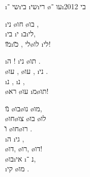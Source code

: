 \textheader%
{\i{שי} }
{ ־\i{בי}}
{}
{\i{שי}\i{רי} }
{ \o{עו}}
{־\i{בי}}
{2012}


\begin{twocol}

\begin{stanza}
\i{ני} \o{חו} \o{בו} ,\\
\i{בי} \i{י} \i{ב}\i{לי},\\
\u{מו}\i{לי} , \u{כו}\o{לו} \i{לי}!
\end{stanza}




\begin{stanza}
\i{ה} ! \i{ני} \o{תו}  .\\
\o{עו} , \o{עו} , \i{ני}  .\\
 \i{נ} , \i{נ}  ,\\
 \o{רא} \o{עו} \i{מ}\o{תו}!
\end{stanza}




\begin{stanza}
\u{נו} \o{בו}\o{נו} \o{מו},\\
\o{חו}\o{צו} \o{בו}  \o{לו}\\
\u{ו} \o{חו}\o{רו} .\\
\i{ה} \i{גי} ,\\
\o{דו}, \o{רו}, \o{דו}!\\
\o{בו}\i{אי} \i{נ} ־,\\
\i{קי} \o{מו} .
\end{stanza}





\end{twocol}
